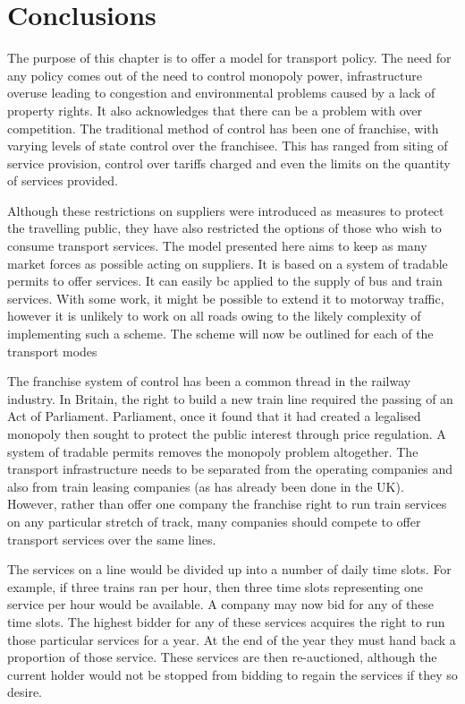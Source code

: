 \chapter{Conclusions}

The purpose of this chapter is to offer a model for transport policy. The need for any policy comes out of the need to control monopoly power, infrastructure overuse leading to congestion and environmental problems caused by a lack of property rights. It also acknowledges that there can be a problem with over competition. The traditional method of control has been one of franchise, with varying levels of state control over the franchisee. This has ranged from siting of service provision, control over tariffs charged and even the limits on the quantity of services provided.

Although these restrictions on suppliers were introduced as measures to protect the travelling public, they have also restricted the options of those who wish to consume transport services. The model presented here aims to keep as many market forces as possible acting on suppliers. It is based on a system of tradable permits to offer services. It can easily bc applied to the supply of bus and train services. With some work, it might be possible to extend it to motorway traffic, however it is unlikely to work on all roads owing to the likely complexity of implementing such a scheme. The scheme will now be outlined for each of the transport modes

The franchise system of control has been a common thread in the railway industry. In Britain, the right to build a new train line required the passing of an Act of Parliament. Parliament, once it found that it had created a legalised monopoly then sought to protect the public interest through price regulation. A system of tradable permits removes the monopoly problem altogether. The transport infrastructure needs to be separated from the operating companies and also from train leasing companies (as has already been done in the UK). However, rather than offer one company the franchise right to run train services on any particular stretch of track, many companies should compete to offer transport services over the same lines.

The services on a line would be divided up into a number of daily time slots. For example, if three trains ran per hour, then three time slots representing one service per hour would be available. A company may now bid for any of these time slots. The highest bidder for any of these services acquires the right to run those particular services for a year. At the end of the year they must hand back a proportion of those service. These services are then re-auctioned, although the current holder would not be stopped from bidding to regain the services if they so desire.

